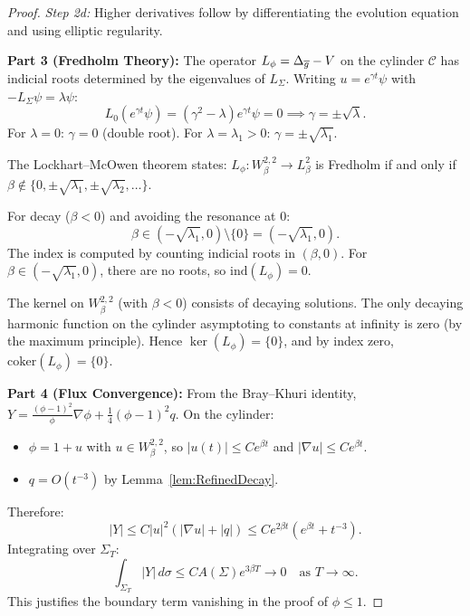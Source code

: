 \begin{proof}
\textit{Step 2d:} Higher derivatives follow by differentiating the evolution equation and using elliptic regularity.

\textbf{Part 3 (Fredholm Theory):}
The operator $L_\phi = \Delta_{\overline{g}} - V$ on the cylinder $\mathcal{C}$ has indicial roots determined by the eigenvalues of $L_\Sigma$. Writing $u = e^{\gamma t} \psi$ with $-L_\Sigma \psi = \lambda \psi$:
\begin{equation}
    L_0(e^{\gamma t} \psi) = (\gamma^2 - \lambda) e^{\gamma t} \psi = 0 \implies \gamma = \pm \sqrt{\lambda}.
\end{equation}
For $\lambda = 0$: $\gamma = 0$ (double root).
For $\lambda = \lambda_1 > 0$: $\gamma = \pm \sqrt{\lambda_1}$.

The Lockhart--McOwen theorem states: $L_\phi: W^{2,2}_\beta \to L^2_\beta$ is Fredholm if and only if 
$\beta \notin \{0, \pm\sqrt{\lambda_1}, \pm\sqrt{\lambda_2}, \ldots\}$.

For decay ($\beta < 0$) and avoiding the resonance at $0$:
\begin{equation}
    \beta \in (-\sqrt{\lambda_1}, 0) \setminus \{0\} = (-\sqrt{\lambda_1}, 0).
\end{equation}
The index is computed by counting indicial roots in $(\beta, 0)$. For $\beta \in (-\sqrt{\lambda_1}, 0)$, there are no roots, so $\text{ind}(L_\phi) = 0$.

The kernel on $W^{2,2}_\beta$ (with $\beta < 0$) consists of decaying solutions. The only decaying harmonic function on the cylinder asymptoting to constants at infinity is zero (by the maximum principle). Hence $\ker(L_\phi) = \{0\}$, and by index zero, $\text{coker}(L_\phi) = \{0\}$.

\textbf{Part 4 (Flux Convergence):}
From the Bray--Khuri identity, $Y = \frac{(\phi-1)^2}{\phi} \nabla \phi + \frac{1}{4}(\phi-1)^2 q$. On the cylinder:
\begin{itemize}
    \item $\phi = 1 + u$ with $u \in W^{2,2}_\beta$, so $|u(t)| \le C e^{\beta t}$ and $|\nabla u| \le C e^{\beta t}$.
    \item $q = O(t^{-3})$ by Lemma~\ref{lem:RefinedDecay}.
\end{itemize}
Therefore:
\begin{equation}
    |Y| \le C |u|^2 (|\nabla u| + |q|) \le C e^{2\beta t} (e^{\beta t} + t^{-3}).
\end{equation}
Integrating over $\Sigma_T$:
\begin{equation}
    \int_{\Sigma_T} |Y| \, d\sigma \le C A(\Sigma) e^{3\beta T} \to 0 \quad \text{as } T \to \infty.
\end{equation}
This justifies the boundary term vanishing in the proof of $\phi \le 1$.
\end{proof}

